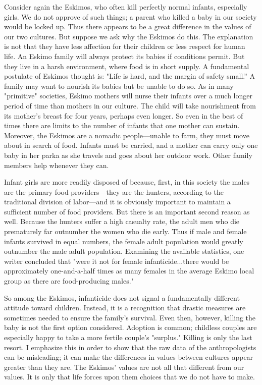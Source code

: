 Consider  again the  Eskimos,  who  often  kill  perfectly  normal  infants, 
especially girls. We do not approve of such things; a parent who killed a 
baby  in  our  society  would  be  locked  up.  Thus  there  appears  to  be  a 
great  difference  in  the  values  of  our  two  cultures.  But  suppose  we  ask 
why  the  Eskimos  do  this.  The  explanation  is  not  that  they  have  less 
affection  for  their  children  or  less  respect  for  human  life.  An  Eskimo 
family will always protect its babies if conditions permit. But they live in a 
harsh environment, where food is in short supply. A fundamental 
postulate  of  Eskimos  thought  is:  "Life  is  hard,  and  the  margin  of  safety 
small.” A family may want to nourish its babies but be unable to do so. 
As  in many "primitive" societies,  Eskimo mothers will nurse  their  infants 
over a much longer period of time than mothers in our culture. The child 
will  take  nourishment  from  its  mother's  breast  for  four  years,  perhaps 
even longer. So even in the best of times there are limits to the number 
of  infants  that  one  mother  can  sustain.  Moreover,  the  Eskimos  are  a 
nomadic  people—unable  to  farm,  they  must  move  about  in  search  of 
food.  Infants  must  be carried,  and  a  mother  can  carry only  one  baby in 
her parka as she travels and goes about her outdoor work. Other family 
members help whenever they can. 

Infant girls are more readily disposed of because, first, in this society the 
males are the primary food providers—they are the hunters, according to 
the traditional division of labor—and it is obviously important to maintain 
a  sufficient  number  of  food  providers.  But  there  is  an  important  second 
reason as well. Because the hunters suffer a high casualty rate, the adult 
men who die prematurely far outnumber the women who die early. Thus 
if  male  and  female  infants  survived  in  equal  numbers,  the  female  adult 
population would greatly outnumber the male adult population. 
Examining the available statistics, one writer concluded that "were it not 
for female infanticide...there  would  be  approximately  one-and-a-half 
times  as  many  females  in  the  average Eskimo  local  group  as  there are 
food-producing males." 

So  among  the  Eskimos,  infanticide  does  not  signal  a  fundamentally 
different  attitude  toward  children.  Instead,  it  is  a  recognition  that  drastic 
measures  are  sometimes  needed  to  ensure  the  family's  survival.  Even 
then, however, killing the baby is not the first option considered. 
Adoption  is  common;  childless  couples  are  especially  happy  to  take  a 
more fertile couple's "surplus." Killing is only the last resort. I emphasize 
this  in  order  to  show  that  the  raw  data  of  the  anthropologists  can  be 
misleading;  it  can  make  the  differences  in  values  between  cultures 
appear  greater  than  they  are.  The  Eskimos'  values  are  not  all  that 
different from our values. It is only that life forces upon them choices that 
we do not have to make. 

